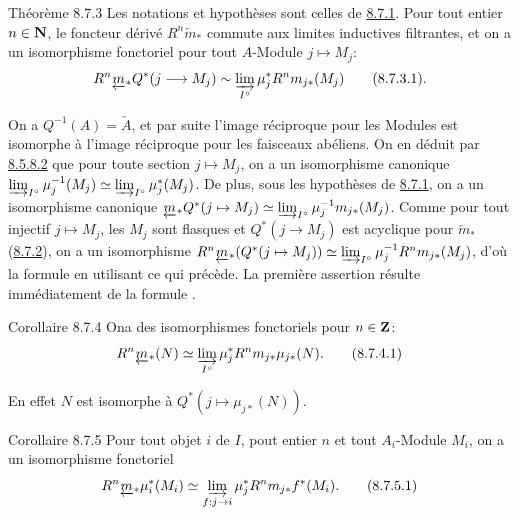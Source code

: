 \documentclass[10pt]{../fichiers-configuration-latex/smfart}
\begin{document}
\begin{enonce*}{Théorème 8.7.3}
Les notations et hypothèses sont celles de \hyperref[VI.subsubsec8.7.1]{8.7.1}. Pour tout entier $n
\in \mathbf{N}$, le foncteur dérivé $R^{n}\underleftarrow{m}_{\ast}$ commute
aux limites inductives filtrantes, et on a un isomorphisme fonctoriel
pour tout $A$-Module $j \mapsto M_j$:
\begin{equation*}
R^{n} \underleftarrow{m}_{\ast} Q^{\ast} (j \to M_j) \sim \varinjlim_{I^{\circ}}
\mu^{\ast}_j R^n m_{j\ast} (M_j)\tag{8.7.3.1}{\quoi}.
\end{equation*}
\end{enonce*}

On a $Q^{-1} (A) = \underrightarrow{A}$, et par suite l'image réciproque
pour les Modules est isomorphe à l'image réciproque pour les faisceaux
abéliens. On en déduit par \hyperref[VI.eq8.5.8.2]{8.5.8.2} que pour toute section $j
\mapsto M_j$, on a un
isomorphisme canonique $\varinjlim_{I^{\circ}} \mu^{-1}_j (M_j) \simeq
\varinjlim_{I^{\circ}} \mu^{\ast}_j (M_j)$. De plus,
sous les hypothèses de \hyperref[VI.subsubsec8.7.1]{8.7.1}, on a un isomorphisme canonique 
$\underleftarrow{m}_{\ast} Q^{\ast} (j \mapsto M_j) \simeq
\varinjlim_{I^{\circ}} \mu^{-1}_j
m_{j\ast}(M_j)$. Comme pour tout injectif $j \mapsto M_j$, les $M_j$
sont flasques et $Q^{\ast} (j \to M_j)$ est acyclique pour
$\underleftarrow{m}_{\ast}$ (\hyperref[VI.lem8.7.2]{8.7.2}), on a un isomorphisme $R^{n}
\underleftarrow{m}_{\ast} (Q^{\ast} (j \mapsto M_j)) \simeq
\varinjlim_{I^{\circ}} \mu^{-1}_j R^n m_{j\ast}(M_j)$,
d'où la formule  en utilisant ce qui
précède. La première
assertion résulte immédiatement de la formule .

\begin{enonce*}{Corollaire 8.7.4}
On\pageoriginale a des isomorphismes fonctoriels pour $n \in \mathbf{Z}$:
\begin{equation*}
R^n \underleftarrow{m}_{\ast} (N) \simeq \varinjlim_{I^{\circ}}
\mu^{\ast}_j R^n m_{j\ast} \mu_{j\ast} (N){}.\tag{8.7.4.1}
\end{equation*}
\end{enonce*}

En effet $N$ est isomorphe à $Q^{\ast}(j \mapsto \mu_{j \ast}(N))$.

\begin{enonce*}{Corollaire 8.7.5}
Pour tout objet $i$ de $I$, pout entier $n$ et tout $A_i$-Module
$M_i$, on a un isomorphisme fonctoriel
\begin{equation*}
R^n \underleftarrow{m}_{\ast} \mu^{\ast}_i (M_i) \simeq
\varinjlim_{f : j \to i} \mu^{\ast}_j R^n m_{j\ast} f^{\ast}
(M_i){\quoi}.\tag{8.7.5.1}
\end{equation*}
\end{enonce*}
\end{document}
